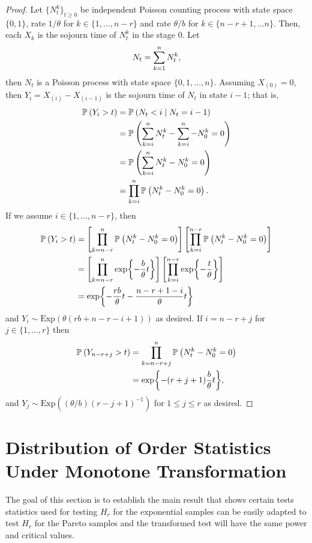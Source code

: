 \documentclass{report}
\begin{document}
 \begin{proof}
 
     Let $\{N_t^k\}_{t\geq 0}$ be independent Poisson counting process with state space $\{0,1\}$, rate $1/\theta$ for $k\in\{1,\ldots,n-r\}$ and rate $\theta/b$ for $k \in \{n-r+1,\ldots n\}$. 
     Then, each $X_k$ is the sojourn time of $N_t^k$ in the stage $0$. Let
      \[ 
          N_t = \sumk{n} N_t^k,
      \]
     then $N_t$ is a Poisson process with state space $\{0,1,\ldots,n\}$. Assuming $X_{(0)} = 0$, then $Y_i = X_{(i)} - X_{(i-1)}$ is the sojourn time of $N_t$ in state $i-1$; that is,
     \begin{align*}
         \P{Y_i > t} &= \P{N_t < i \mid N_t = i-1 }
         \\
         &=\P{ \sumk[i]{n} N_t^k - \sumk[i]{n} - N_0^k = 0 }
         \\
         &= \P{ \sumk[i]{n} N_t^k- N_0^k = 0 }
         \\
         & = \prodk[i]{n} \P{N_t^k- N_0^k = 0}.
     \end{align*}
     If we assume $i \in \{1,\ldots,n-r\}$, then
     \begin{align*}
         \P{Y_i >t} &= \left[\prodk[n-r]{n} \P{N_t^k- N_0^k = 0}\right] \left[ \prodk[i]{n-r} \P{N_t^k- N_0^k = 0} \right]
         \\
         &= \left[\prodk[n-r]{n} \exp{ - \frac{b}{\theta} t }\right] \left[ \prodk[i]{n-r} \exp{- \frac{t}{\theta}} \right]
         \\
         &= \exp{ - \frac{rb}{\theta} t - \frac{n-r+1-i}{\theta} t}
     \end{align*}
     and $Y_i \sim \mathrm{Exp}( \theta(rb + n-r-i+1))$ as desired. If $i = n-r + j$ for $j \in \{1,\ldots,r\}$ then
     \begin{align*}
         \P{Y_{n-r+j} >t} &= \prodk[n-r+j]{n} \P{N_t^k- N_0^k = 0}
         \\
         &= \exp{ - (r+j+1)\frac{b}{\theta}t},
     \end{align*}
     and $Y_j \sim \mathrm{Exp}((\theta/b)(r-j+1)^{-1})$ for $ 1 \leqslant j \leqslant r$ as desired.    
 \end{proof}


\section{Distribution of Order Statistics Under Monotone Transformation} \label{sec: monton trans}

The goal of this section is to establish the main result that shows certain tests statistics used for testing $H_r$ for the exponential samples
can be easily adapted to test $H_r$ for the Pareto samples and the transformed test will have the same power and critical values.
\end{document}
